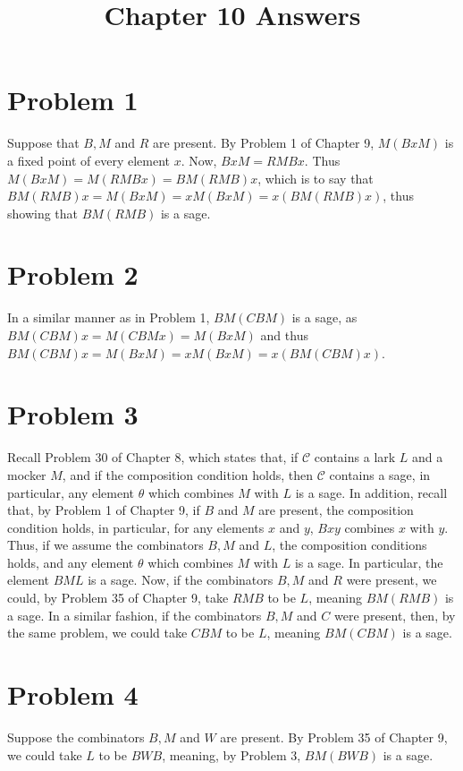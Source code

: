 \documentclass{article}
\title{Chapter 10 Answers}
\theoremstyle{definition}
\begin{document}
\date{}
\maketitle

\section*{Problem 1}
Suppose that $B,M$ and $R$ are present. By Problem 1 of Chapter 9, $M(BxM)$ is a fixed point of every element $x$. Now, $BxM=RMBx$. Thus 
$M(BxM)=M(RMBx)=BM(RMB)x$, which is to say that $BM(RMB)x=M(BxM)=xM(BxM)=x(BM(RMB)x)$, thus showing that $BM(RMB)$ is a sage.

\section*{Problem 2}
In a similar manner as in Problem 1, $BM(CBM)$ is a sage, as $BM(CBM)x=M(CBMx)=M(BxM)$ and thus $BM(CBM)x=M(BxM)=xM(BxM)=x(BM(CBM)x)$. 

\section*{Problem 3}
Recall Problem 30 of Chapter 8, which states that, if $\mathcal{C}$ contains a lark $L$ and a mocker $M$, and if the composition condition holds, then 
$\mathcal{C}$ contains a sage, in particular, any element $\theta$ which combines $M$ with $L$ is a sage. In addition, recall that, by Problem 1 of Chapter 9, 
if $B$ and $M$ are present, the composition condition holds, in particular, for any elements $x$ and $y$, $Bxy$ combines $x$ with $y$. 
Thus, if we assume the combinators $B,M$ and $L$, the composition conditions holds, and any element $\theta$ which combines $M$ with $L$ is a sage. 
In particular, the element $BML$ is a sage. Now, if the combinators $B,M$ and $R$ were present, we could, by Problem 35 of Chapter 9, take 
$RMB$ to be $L$, meaning $BM(RMB)$ is a sage. In a similar fashion, if the combinators $B,M$ and $C$ were present, then, by the same problem, 
we could take $CBM$ to be $L$, meaning $BM(CBM)$ is a sage. 

\section*{Problem 4}
Suppose the combinators $B,M$ and $W$ are present. By Problem 35 of Chapter 9, we could take $L$ to be $BWB$, meaning, by Problem 3, $BM(BWB)$ is a sage.
\end{document}

